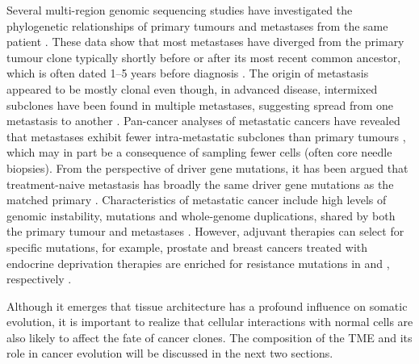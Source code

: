 Several multi-region genomic sequencing studies have investigated the phylogenetic relationships of primary tumours and metastases from the same patient \parencite{Gerlinger2012-qm,De_Bruin2014-ow,Yates2015-xk,Jamal-Hanjani2017-uv,Jones2008-sd,Mamlouk2017-wt,Zhou2021-oj,Yates2017-xc,Noorani2020-dp,Karlsson2018-kv}. These data show that most metastases have diverged from the primary tumour clone typically shortly before or after its most recent common ancestor, which is often dated 1–5 years before diagnosis \parencite{Yates2017-xc,Noorani2020-dp,Gundem2015-kg,Hu2020-ui}. The origin of metastasis appeared to be mostly clonal \parencite{Brastianos2015-ox,Brown2017-de,De_Mattos-Arruda2019-sb} even though, in advanced disease, intermixed subclones have been found in multiple metastases, suggesting spread from one metastasis to another \parencite{Noorani2020-dp,Gundem2015-kg,Aceto2014-lu}. Pan-cancer analyses of metastatic cancers have revealed that metastases exhibit fewer intra-metastatic subclones than primary tumours \parencite{Priestley2019-wi,Martinez-Jimenez2022-tl,Nguyen2022-jr}, which may in part be a consequence of sampling fewer cells (often core needle biopsies). From the perspective of driver gene mutations, it has been argued that treatment-naive metastasis has broadly the same driver gene mutations as the matched primary \parencite{Reiter2019-bc}. Characteristics of metastatic cancer include high levels of genomic instability,  mutations and whole-genome duplications, shared by both the primary tumour and metastases \parencite{Priestley2019-wi,Nguyen2022-jr}. However, adjuvant therapies can select for specific mutations, for example, prostate and breast cancers treated with endocrine deprivation therapies are enriched for resistance mutations in  and , respectively \parencite{Martinez-Jimenez2022-tl,Nguyen2022-jr}.

Although it emerges that tissue architecture has a profound influence on somatic evolution, it is important to realize that cellular interactions with normal cells are also likely to affect the fate of cancer clones. The composition of the TME and its role in cancer evolution will be discussed in the next two sections.

